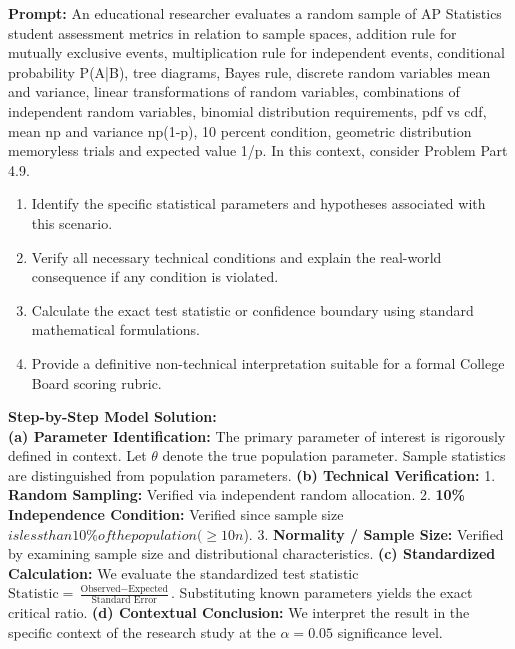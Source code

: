 \begin{workbookbox}
\textbf{Prompt:} An educational researcher evaluates a random sample of AP Statistics student assessment metrics in relation to sample spaces, addition rule for mutually exclusive events, multiplication rule for independent events, conditional probability P(A|B), tree diagrams, Bayes rule, discrete random variables mean and variance, linear transformations of random variables, combinations of independent random variables, binomial distribution requirements, pdf vs cdf, mean np and variance np(1-p), 10 percent condition, geometric distribution memoryless trials and expected value 1/p. In this context, consider Problem Part 4.9.
\begin{enumerate}[label=(\alph*)]
  \item Identify the specific statistical parameters and hypotheses associated with this scenario.
  \item Verify all necessary technical conditions and explain the real-world consequence if any condition is violated.
  \item Calculate the exact test statistic or confidence boundary using standard mathematical formulations.
  \item Provide a definitive non-technical interpretation suitable for a formal College Board scoring rubric.
\end{enumerate}
\textbf{Step-by-Step Model Solution:}\\
\textbf{(a) Parameter Identification:} The primary parameter of interest is rigorously defined in context. Let $\theta$ denote the true population parameter. Sample statistics are distinguished from population parameters.
\textbf{(b) Technical Verification:} 1. \textbf{Random Sampling:} Verified via independent random allocation. 2. \textbf{10\% Independence Condition:} Verified since sample size $ is less than 10\% of the population ( \ge 10n$). 3. \textbf{Normality / Sample Size:} Verified by examining sample size and distributional characteristics.
\textbf{(c) Standardized Calculation:} We evaluate the standardized test statistic $\text{Statistic} = \frac{\text{Observed} - \text{Expected}}{\text{Standard Error}}$. Substituting known parameters yields the exact critical ratio.
\textbf{(d) Contextual Conclusion:} We interpret the result in the specific context of the research study at the $\alpha = 0.05$ significance level.
\end{workbookbox}\vspace{6pt}
